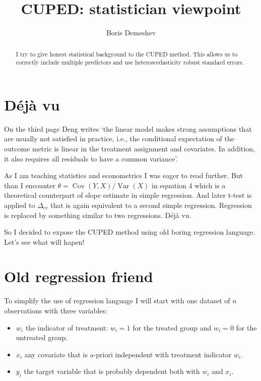 \documentclass[10pt, a4paper]{article}
\title{CUPED: statistician viewpoint}
\author{Boris Demeshev}
\DeclareMathOperator{\Var}{Var}
\DeclareMathOperator{\Cov}{Cov}
\begin{document}
\begin{abstract}
    I try to give honest statistical background to the CUPED method.
    This allows us to correctly include multiple predictors and 
    use heteroscedasticity robust standard errors.
\end{abstract}


\maketitle

\section{Déjà vu}

On the third page Deng writes ‘the linear model makes strong assumptions that
are usually not satisfied in practice, i.e., the conditional expectation of the outcome metric is linear in the treatment
assignment and covariates. In addition, it also requires all
residuals to have a common variance’.

As I am teaching statistics and econometrics I was eager to read further. 
But than I encounter $\theta = \Cov(Y, X) / \Var(X)$ in equation 4 which is a theoretical
counterpart of slope estimate in simple regression. 
And later t-test is applied to $\Delta_{cv}$ that is again equivalent to a second simple regression.
Regression is replaced by something similar to two regressions. Déjà vu.

So I decided to expose the CUPED method using old boring regression language. 
Let's see what will hapen!

\section{Old regression friend}

To simplify the use of regression language I will start with one dataset of $n$ observations
with three variables:

\begin{itemize}
    \item $w_i$ the indicator of treatment: $w_i = 1$ for the treated group and $w_i=0$ for 
    the untreated group.
    \item $x_i$ any covariate that is a-priori independent with treatment indicator $w_i$.
    \item $y_i$ the target variable that is probably dependent both with $w_i$ and 
    $x_i$. 
\end{itemize}
\end{document}
